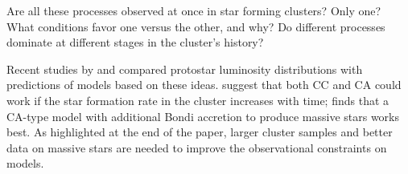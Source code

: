 Are all these processes observed at once in star forming clusters? Only one? What conditions favor one versus the other, and why? Do different processes dominate at different stages in the cluster's history?

Recent studies by \citet{Offner:2011ex} and \citet{Myers:2011fy} compared protostar luminosity distributions with predictions of models based on these ideas. \citet{Offner:2011ex} suggest that both CC and CA could work if the star formation rate in the cluster increases with time; \citep{Myers:2011fy} finds that a CA-type model with additional Bondi accretion to produce massive stars works best. As highlighted at the end of the \citet{Offner:2011ex} paper, larger cluster samples and better data on massive stars are needed to improve the observational constraints on models.


%
%
%



